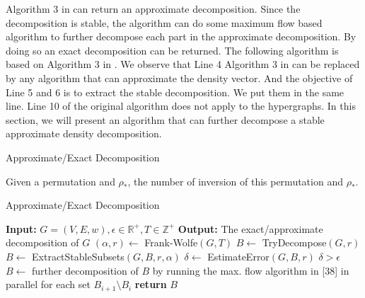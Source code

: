 {{Algorithm 3 in \cite{DBLP:conf/www/DanischCS17} can return an approximate decomposition. Since the decomposition is stable, the algorithm can do some maximum flow based algorithm to further decompose each part in the approximate decomposition. By doing so an exact decomposition can be returned. The following algorithm is based on Algorithm 3 in \cite{DBLP:conf/www/DanischCS17}. We observe that Line 4 Algorithm 3 in \cite{DBLP:conf/www/DanischCS17} can be replaced by any algorithm that can approximate the density vector. And the objective of Line 5 and 6 is to extract the stable decomposition. We put them in the same line. Line 10 of the original algorithm does not apply to the hypergraphs. In this section, we will present an algorithm that can further decompose a stable approximate density decomposition. 



\begin{algorithm}[H]
	\SetAlgoLined
	\label{algo:exact-decom}
	\caption{Approximate/Exact Decomposition}
\end{algorithm}




Given a permutation and $\rho_*$, the number of inversion of this permutation and $\rho_*$. 


\begin{algorithm}
	\caption{Approximate/Exact Decomposition}
	\begin{algorithmic}[1]
		\State \textbf{Input:} $G = (V, E, w), \epsilon \in \mathbb{R}^+, T \in \mathbb{Z}^+$
		\State \textbf{Output:} The exact/approximate decomposition of $G$
		\Repeat
		\State $(\alpha, r) \gets$ Frank-Wolfe$(G, T)$
		\State $B \gets$ TryDecompose$(G, r)$
		\State $B \gets$ ExtractStableSubsets$(G, B, r, \alpha)$
		\State $\delta \gets$ EstimateError$(G, B, r)$
		\Until $\delta > \epsilon$
		\State $B \gets$ further decomposition of $B$ by running the max. flow algorithm in [38] in parallel for each set $B_{i+1} \setminus B_i$
		\EndIf
		\State \textbf{return} $B$
	\end{algorithmic}
\end{algorithm}

}

}


